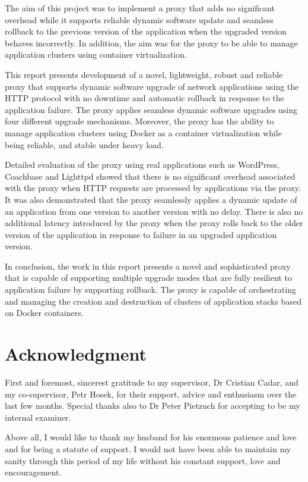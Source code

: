 \documentclass[a4paper,11pt,twoside]{report}
\newcommand\blankpage{%
\null
\thispagestyle{empty}%
\addtocounter{page}{-1}%
\newpage}
\begin{document}
The aim of this project was to implement a  proxy that adds no significant overhead while it supports reliable dynamic software update and seamless rollback to the previous version of the application when the upgraded version behaves incorrectly. In addition, the aim was for the proxy to be able to manage application clusters using container virtualization.

This report presents development of a novel, lightweight, robust and reliable proxy that supports dynamic software upgrade of network applications using the HTTP protocol with no downtime and automatic rollback in response to the application failure. The proxy applies seamless dynamic software upgrades using four different upgrade mechanisms. Moreover, the proxy has the ability to manage application clusters using Docker as a container virtualization while being reliable, and stable under heavy load.

Detailed evaluation of the proxy using real applications such as WordPress, Coachbase and Lighttpd showed that there is no significant overhead associated with the proxy when HTTP requests are processed by applications via the proxy. It was also demonstrated that the proxy seamlessly applies a dynamic update of an application from one version to another version with no delay. There is also no additional latency introduced by the proxy when the proxy rolls back to the older version of the application in response to failure in an upgraded application version. 

In conclusion, the work in this report presents a novel and sophisticated proxy that is capable of supporting multiple upgrade modes that are fully resilient to application failure by supporting rollback. The proxy is capable of orchestrating and managing  the creation and destruction of clusters of application stacks based on Docker containers.


\afterpage{\blankpage}
\clearpage

\section*{Acknowledgment}
First and foremost, sincerest gratitude to my supervisor, Dr Cristian Cadar, and my co-supervisor, Petr Hosek, for their support, advice and enthusiasm over the last few months. Special thanks also to Dr Peter Pietzuch for accepting to be my internal examiner.   

Above all, I would like to thank my husband for his enormous patience and love and for being a statute of support. I would not have been able to maintain my sanity through this period of my life without his constant support, love and encouragement.
\end{document}
